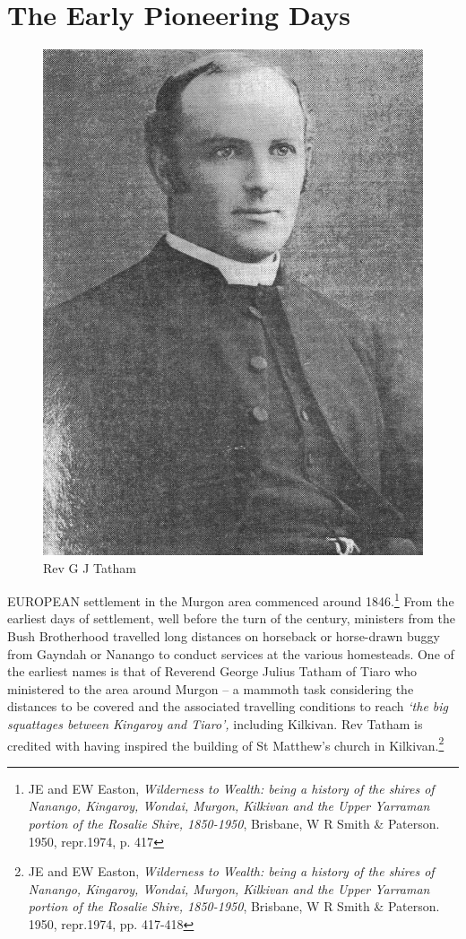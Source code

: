 

\chapter{The Early Pioneering Days}
\nobalance








\begin{figure}
\begin{center}
\includegraphics[width=.5\linewidth,center]{../images/RGTatham.jpg}
\caption{Rev G J Tatham}
\end{center}
\end{figure}




\lettrine[lines=3]{E}{UROPEAN}
 settlement in the Murgon area commenced around 1846.\footnote{JE and EW Easton, \emph{Wilderness to Wealth: being a history of the shires of Nanango, Kingaroy, Wondai, Murgon, Kilkivan and the Upper Yarraman portion of the Rosalie Shire, 1850-1950}, Brisbane, W R Smith \& Paterson. 1950, repr.1974, p. 417} From the earliest days of settlement, well before the turn of the century, ministers from the Bush Brotherhood travelled long distances on horseback or horse-drawn buggy from Gayndah or Nanango to conduct services at the various homesteads. One of the earliest names is that of Reverend George Julius Tatham of Tiaro who ministered to the area around Murgon -- a mammoth task considering the distances to be covered and the associated travelling conditions to reach \emph{`the big squattages between Kingaroy and Tiaro',} including Kilkivan. Rev Tatham is credited with having inspired the building of St Matthew's church in Kilkivan.\footnote{JE and EW Easton, \emph{Wilderness to Wealth: being a history of the shires of Nanango, Kingaroy, Wondai, Murgon, Kilkivan and the Upper Yarraman portion of the Rosalie Shire, 1850-1950}, Brisbane, W R Smith \& Paterson. 1950, repr.1974, pp. 417-418}

